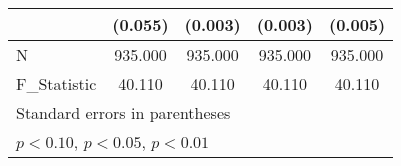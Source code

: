 {\begin{tabular}{l*{4}{c}}
            &     (0.055)         &     (0.003)         &     (0.003)         &     (0.005)         \\
\hline
N           &     935.000         &     935.000         &     935.000         &     935.000         \\
F\_Statistic &      40.110         &      40.110         &      40.110         &      40.110         \\
\hline\hline
\multicolumn{5}{l}{\footnotesize Standard errors in parentheses}\\
\multicolumn{5}{l}{\footnotesize \sym{*} \(p<0.10\), \sym{**} \(p<0.05\), \sym{***} \(p<0.01\)}\\
\end{tabular}
}
